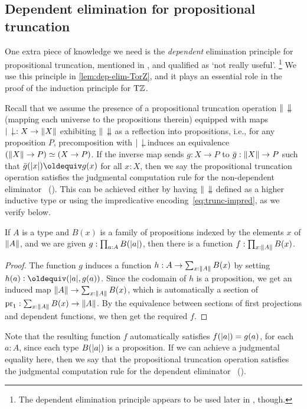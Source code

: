 \documentclass[a4paper,12pt]{amsart}
\begin{document}
\subsection{Dependent elimination for propositional truncation}
\label{sec:proptrunc}

One extra piece of knowledge we need is the \emph{dependent} elimination
principle for propositional truncation, mentioned in \cite[6.9]{hottbook},
and qualified as `not really useful'.%
\footnote{The dependent elimination principle appears to
  be used later in \cite[Lemma 7.3.3]{hottbook}, though.
}
We use this principle in \cref{lem:dep-elim-TorZ}, and it plays an
essential role in the proof of the induction principle for ${\mathrm{T}\mathbb{Z}}$.

Recall that we assume the presence of a propositional truncation operation
$\Trunc{\blank}$ (mapping each universe to the propositions therein) equipped with
maps $\trunc{\blank} : X \to \Trunc X$ exhibiting $\Trunc{\blank}$ as a reflection into
propositions, i.e., for any proposition $P$, precomposition with $\trunc{\blank}$
induces an equivalence $(\lVert X\rVert\to P) \simeq (X\to P)$.
If the inverse map sends $g:X\to P$ to $\bar g : \lVert X\rVert \to P$
such that $\bar g(\trunc x) \jdeq g(x)$ for all $x:X$,
then we say the propositional truncation operation satisfies the
judgmental computation rule for the non-dependent eliminator~%
().
This can be achieved either by having $\Trunc{\blank}$ defined as a higher inductive type
or using the impredicative encoding~\eqref{eq:trunc-impred}, as we verify below.

\begin{lemma}\label{lem:proptruncind}
  If $A$ is a type and $B(x)$ is a family of propositions
  indexed by the elements $x$ of $\lVert A\rVert$,
  and we are given $g : \prod_{a:A} B(\lvert a\rvert)$,
  then there is a function $f : \prod_{x:\lVert A\rVert} B(x)$.
\end{lemma}
\begin{proof}
  The function $g$ induces a function $h : A \to \sum_{x:\lVert A\rVert}B(x)$
  by setting $h(a) \defeq (\trunc a,g(a))$.
  Since the codomain of $h$ is a proposition,
  we get an induced map $\lVert A\rVert \to \sum_{x:\lVert A\rVert}B(x)$,
  which is automatically a section of $\operatorname{pr}_1 : \sum_{x:\lVert A\rVert}B(x) \to \lVert A\rVert$.
  By the equivalence between sections of first projections
  and dependent functions, we then get the required $f$.
\end{proof}
Note that the resulting function $f$ automatically satisfies
$f(\lvert a\rvert) = g(a)$, for each $a:A$,
since each type $B(\lvert a\rvert)$ is a proposition.
If we can achieve a judgmental equality here,
then we say that the propositional truncation operation satisfies the
judgmental computation rule for the dependent eliminator~%
().
\end{document}
